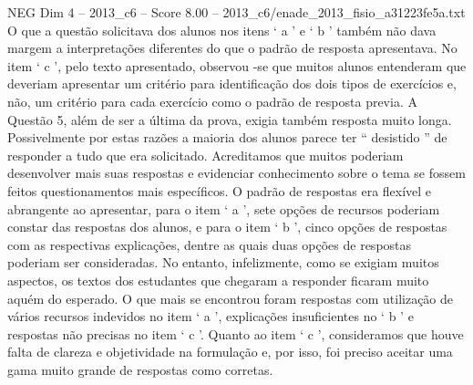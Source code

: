 \begin{textsample}{NEG Dim 4 – 2013\_c6 – Score 8.00 – 2013\_c6/enade\_2013\_fisio\_a31223fe5a.txt}
O que a questão solicitava dos alunos nos itens ‘ a ’ e ‘ b ’ também não dava margem a interpretações diferentes do que o padrão de resposta apresentava.
No item ‘ c ’, pelo texto apresentado, observou -se que muitos alunos entenderam que deveriam apresentar um critério para identificação dos dois tipos de exercícios e, não, um critério para cada exercício como o padrão de resposta previa.
A Questão 5, além de ser a última da prova, exigia também resposta muito longa.
Possivelmente por estas razões a maioria dos alunos parece ter “ desistido ” de responder a tudo que era solicitado.
Acreditamos que muitos poderiam desenvolver mais suas respostas e evidenciar conhecimento sobre o tema se fossem feitos questionamentos mais específicos.
O padrão de respostas era flexível e abrangente ao apresentar, para o item ‘ a ’, sete opções de recursos poderiam constar das respostas dos alunos, e para o item ‘ b ’, cinco opções de respostas com as respectivas explicações, dentre as quais duas opções de respostas poderiam ser consideradas.
No entanto, infelizmente, como se exigiam muitos aspectos, os textos dos estudantes que chegaram a responder ficaram muito aquém do esperado.
O que mais se encontrou foram respostas com utilização de vários recursos indevidos no item ‘ a ’, explicações insuficientes no ‘ b ’ e respostas não precisas no item ‘ c ’.
Quanto ao item ‘ c ’, consideramos que houve falta de clareza e objetividade na formulação e, por isso, foi preciso aceitar uma gama muito grande de respostas como corretas.

\end{textsample}
